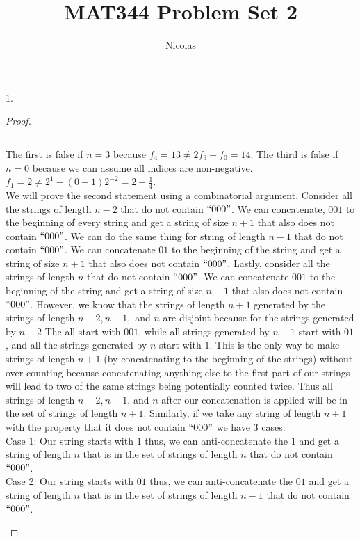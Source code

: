 \documentclass[11pt]{article}
\title{MAT344 Problem Set 2}
\author{Nicolas}
\newenvironment{myproof}
{\begin{proof} \begin{adjustwidth}{3em}{0pt}$ $\par\nobreak\ignorespaces}
{\end{adjustwidth} \end{proof}}
\begin{document}
\maketitle
\begin{flushleft}

1.

\begin{myproof}
The first is false if $n = 3$ because $f_4 = 13 \neq 2 f_3 - f_0 = 14$. The third is false if $n = 0$ because we can assume all indices are non-negative. $f_1 = 2 \neq 2^1 - (0-1)2^{-2} = 2 + \frac{1}{4}$. \\
\bigskip
We will prove the second statement using a combinatorial argument. Consider all the strings of length $n-2$ that do not contain $``000"$. We can concatenate, $001$ to the beginning of every string and get a string of size $n+1$ that also does not contain $``000"$. We can do the same thing for string of length $n-1$ that do not contain $``000"$. We can concatenate $01$ to the beginning of the string and get a string of size $n+1$ that also does not contain $``000"$. Lastly, consider all the strings of length $n$ that do not contain $``000"$. We can concatenate $001$ to the beginning of the string and get a string of size $n+1$ that also does not contain $``000"$. However, we know that the strings of length $n+1$ generated by the strings of length $n-2, n-1,$ and $n$ are disjoint because for the strings generated by $n-2$ The all start with $001$, while all strings generated by $n-1$ start with $01$, and all the strings generated by $n$ start with $1$. This is the only way to make strings of length $n+1$ (by concatenating to the beginning of the strings) without over-counting because concatenating anything else to the first part of our strings will lead to two of the same strings being potentially counted twice. Thus all strings of length $n-2, n-1$, and $n$ after our concatenation is applied will be in the set of strings of length $n+1$. Similarly, if we take any string of length $n+1$ with the property that it does not contain $``000"$ we have 3 cases:\\
\bigskip
Case 1: Our string starts with $1$ thus, we can anti-concatenate the $1$ and get a string of length $n$ that is in the set of strings of length $n$ that do not contain $``000"$. \\
\bigskip
Case 2: Our string starts with $01$ thus, we can anti-concatenate the $01$ and get a string of length $n$ that is in the set of strings of length $n-1$ that do not contain $``000"$. \\

\end{myproof}
\end{flushleft}
\end{document}
